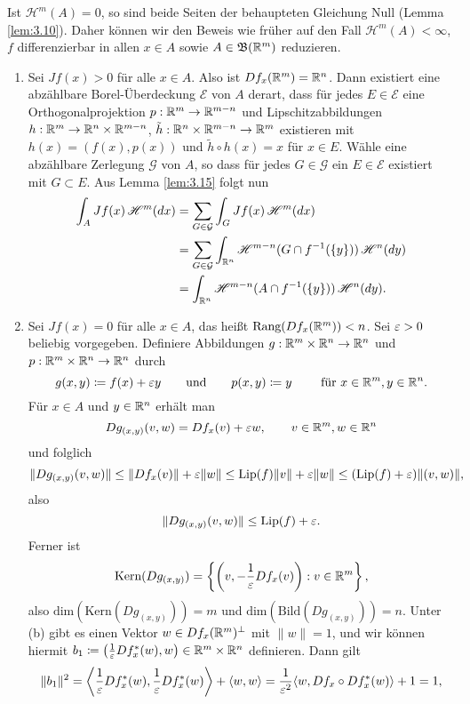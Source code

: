 \documentclass[a4paper,twoside,DIV15,BCOR12mm]{scrbook}
\newcommand{\borel}{\mathfrak B}
\newcommand{\HM}{\mathscr H}
\begin{document}
\begin{beweis}
Ist $\HM^m(A) = 0$, so sind beide Seiten der behaupteten Gleichung Null (Lemma \ref{lem:3.10}). Daher können wir den Beweis wie früher auf den Fall $\HM^m(A)<\infty$, $f$ differenzierbar in allen $x\in A$ sowie $A\in \borel(\MdR^m)$ reduzieren.
\begin{enumerate}[\quad(a)]
\item Sei $Jf(x) > 0$ für alle $x\in A$. Also ist $Df_x(\mathbb{R}^m) = \mathbb{R}^n$. Dann existiert eine abzählbare Borel-Überdeckung $\mathcal E$ von $A$ derart, dass für jedes $E\in\mathcal E$ eine Orthogonalprojektion $p:\mathbb{R}^m\to\mathbb{R}^{m-n}$ und Lipschitzabbildungen $h:\mathbb{R}^m\to\mathbb{R}^n\times\mathbb{R}^{m-n}$, $\tilde h:\mathbb{R}^n\times\mathbb{R}^{m-n}\to \mathbb{R}^m$ existieren mit $h(x) = (f(x), p(x))$ und $\tilde h \circ h (x) = x$ für $x\in E$. Wähle eine abzählbare Zerlegung $\mathcal G$ von $A$, so dass für jedes $G\in\mathcal G$ ein $E\in\mathcal E$ existiert mit $G\subset E$. Aus Lemma \ref{lem:3.15} folgt nun
\begin{align*}
\int_A Jf(x) \,\HM^m(dx) 
&= \sum_{G\in\mathcal G} \int_G Jf(x) \, \HM^m(dx) \\
&= \sum_{G\in\mathcal G} \int_{\MdR^n} \HM^{m-n}(G \cap f^{-1}(\{y\})) \, \HM^n(dy) \\
&= \int_{\MdR^n} \HM^{m-n}( A \cap f^{-1}(\{y\}))\, \HM^n(dy).
\end{align*}
\item Sei  $Jf(x) = 0$ für alle $x\in A$, das heißt $\text{Rang}(Df_x(\mathbb{R}^m))<n$. Sei $\varepsilon>0$ beliebig 
vorgegeben. Definiere Abbildungen $g:\mathbb{R}^m\times \mathbb{R}^n\to\mathbb{R}^n$ und $p:\mathbb{R}^m\times \mathbb{R}^n\to\mathbb{R}^n$ durch
$$
g(x,y)\da f(x)+\ep y\qquad\text{und}\qquad p(x,y)\da y\qquad \text{ für } x\in\MdR^m, y\in \MdR^n.
$$
Für $x\in A$ und $y\in \mathbb{R}^n$ erhält man
$$
Dg_{(x,y)}(v,w)=Df_x(v)+\varepsilon w,\qquad v\in\mathbb{R}^m, w\in \mathbb{R}^n
$$
und folglich
$$
\| Dg_{(x,y)}(v,w)\|\le \|Df_x(v)\|+\varepsilon \|w\|\le \text{Lip}(f)\|v\|+\varepsilon\|w\|\le (\text{Lip}(f)+\varepsilon)\|(v,w)\|,
$$
also 
$$
\| Dg_{(x,y)}(v,w)\|\le\text{Lip}(f)+\varepsilon.
$$
Ferner ist 
$$
\text{Kern}(Dg_{(x,y)})=\left\{ \left(v,-\frac{1}{\varepsilon}Df_x(v)\right):v\in \mathbb{R}^m\right\},
$$
also $\text{dim}(\text{Kern}(Dg_{(x,y)}))=m$ und $\text{dim}(\text{Bild}(Dg_{(x,y)}))=n$. 
Unter (b) gibt es einen Vektor $w\in Df_x(\mathbb{R}^m)^\perp$ mit $\|w\|=1$, und wir können hiermit 
$b_1\da \left(\frac{1}{\ep}Df_x^*(w),w\right)\in\MdR^m\times\MdR^n$ definieren. Dann gilt
$$
\|b_1\|^2=\left\langle \frac{1}{\varepsilon}Df_x^*(w),\frac{1}{\varepsilon}Df_x^*(w)\right\rangle+\langle w,w\rangle=
\frac{1}{\varepsilon^2}\langle w,Df_x\circ Df_x^*(w)\rangle+1=1,
$$
\end{enumerate}
\end{beweis}
\end{document}
